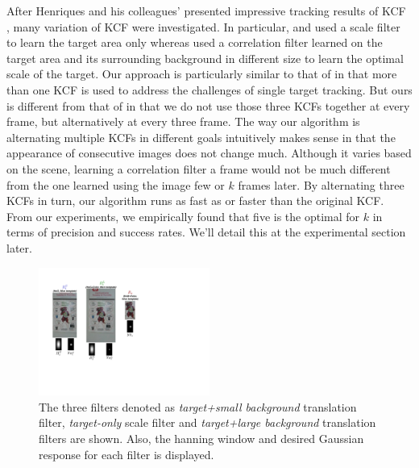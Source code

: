 \documentclass{bmvc2k}
\begin{document}
After Henriques and his colleagues' presented impressive tracking
results of KCF \cite{henriques2015high}, many variation of KCF were
investigated. In particular, \cite{ma2015long} and
\cite{danelljan2014accurate} used a scale filter to learn the target
area only whereas \cite{li2014scale, bibi2015multi, tang2015multi}
used a correlation filter learned on the target area and its
surrounding background in different size to learn the optimal scale of
the target. Our approach is particularly similar to that of
\cite{ma2015long} in that more than one KCF is used to address the
challenges of single target tracking. But ours is different from that
of \cite{ma2015long} in that we do not use those three KCFs together
at every frame, but alternatively at every three frame. The way our
algorithm is alternating multiple KCFs in different goals intuitively
makes sense in that the appearance of consecutive images does not
change much. Although it varies based on the scene, learning a
correlation filter a frame would not be much different from the one
learned using the image few or $k$ frames later. By alternating three
KCFs in turn, our algorithm runs as fast as or faster than the
original KCF. From our experiments, we empirically found that five is
the optimal for $k$ in terms of precision and success rates. We'll
detail this at the experimental section later.

\begin{figure}[!t]
\centering
\includegraphics[width=0.5\textwidth]{figures/Filters_Details.pdf}
\caption{The three filters denoted as \textit{target+small background} translation filter,
  \textit{target-only} scale filter and \textit{target+large background} translation filters are
  shown. Also, the hanning window and desired Gaussian response for
  each filter is displayed.}
\label{fig:Filters}
\end{figure}
\end{document}
